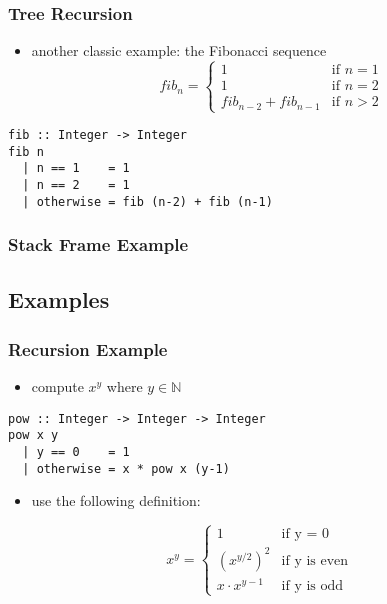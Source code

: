 \documentclass[dvipsnames]{beamer}
\theoremstyle{plain}
\begin{document}
\begin{frame}[fragile]
  \frametitle{Tree Recursion}

  \begin{itemize}
    \item another classic example: the Fibonacci sequence
    \[
      fib_n =
        \begin{cases}
          1                     & \mbox{if } n = 1\\
          1                     & \mbox{if } n = 2\\
          fib_{n-2} + fib_{n-1} & \mbox{if } n > 2
        \end{cases}
    \]
  \end{itemize}

  \begin{exampleblock}{}
    \begin{lstlisting}
fib :: Integer -> Integer
fib n
  | n == 1    = 1
  | n == 2    = 1
  | otherwise = fib (n-2) + fib (n-1)
    \end{lstlisting}
  \end{exampleblock}
\end{frame}

\begin{frame}[fragile]
  \frametitle{Stack Frame Example}

  \begin{center}
  \end{center}
\end{frame}

\subsection{Examples}

\begin{frame}[fragile]
  \frametitle{Recursion Example}

  \begin{itemize}
    \item compute $x^y$ where $y \in \mathbb{N}$
  \end{itemize}

  \smallskip
  \begin{lstlisting}
pow :: Integer -> Integer -> Integer
pow x y
  | y == 0    = 1
  | otherwise = x * pow x (y-1)
  \end{lstlisting}

  \pause
  \begin{itemize}
    \item use the following definition:
  \end{itemize}
  \[
    x^y =
      \begin{cases}
        1               & \mbox{if y = 0}\\
        {(x^{y/2})}^2   & \mbox{if y is even}\\
        x \cdot x^{y-1} & \mbox{if y is odd}
      \end{cases}
  \]
\end{frame}
\end{document}
